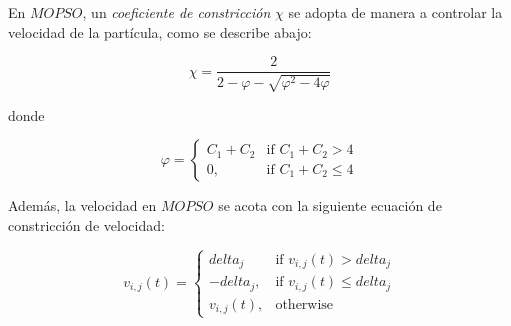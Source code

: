 En $MOPSO$, un \textit{coeficiente de constricción} $\chi$ se adopta de manera a controlar la velocidad de la partícula, como se describe abajo:

\begin{equation}
\chi = \frac{2}{2 - \varphi - \sqrt{\varphi^2 - 4 \varphi}}
\end{equation}





donde


\begin{equation}
\varphi= 
\begin{cases}
C_1 + C_2 & \text{if } C_1 + C_2 > 4\\
0,              & \text{if } C_1 + C_2 \leq 4
\end{cases}
\end{equation}

Además, la velocidad en $MOPSO$ se acota con la siguiente ecuación de constricción de velocidad:

\begin{equation}\label{eq:restricciondelta}
v_{i,j}(t)= 
\begin{cases}
delta_j & \text{if } v_{i,j}(t) > delta_j\\
-delta_j,      & \text{if } v_{i,j}(t) \leq delta_j \\
v_{i,j}(t),      & \text{otherwise }
\end{cases}
\end{equation}

